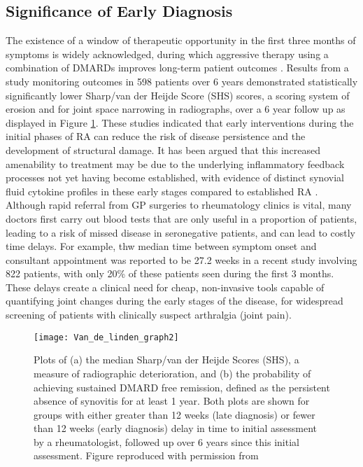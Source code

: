 \documentclass[twoside]{bhamthesis}
\theoremstyle{definition}
\begin{document}
\subsection{Significance of Early Diagnosis}

The existence of a window of therapeutic opportunity \cite{nell2004benefit} in the first three months of symptoms is widely acknowledged, during which aggressive therapy using a combination of DMARDs improves long-term patient outcomes \cite{landewe2002cobra}. Results from a study monitoring outcomes in 598 patients over 6 years \cite{van2010long} demonstrated statistically significantly lower Sharp/van der Heijde Score (SHS) scores, a scoring system of erosion and for joint space narrowing in radiographs, over a 6 year follow up as displayed in Figure \ref{fig:Van_de_linden_graph2}. These studies indicated that early interventions during the initial phases of RA can reduce the risk of disease persistence and the development of structural damage. It has been argued that this increased amenability to treatment may be due to the underlying inflammatory feedback processes not yet having become established, with evidence of distinct synovial fluid cytokine profiles in these early stages compared to established RA \cite{raza2005early}. Although rapid referral from GP surgeries to rheumatology clinics is vital, many doctors first carry out blood tests that are only useful in a proportion of patients, leading to a risk of missed disease in seronegative patients, and can lead to costly time delays. For example, thw median time between symptom onset and consultant appointment was reported to be 27.2 weeks in a recent study involving 822 patients, with only 20\% of these patients seen during the first 3 months\cite{stack2019delays}. These delays create a clinical need for cheap, non-invasive tools capable of quantifying joint changes during the early stages of the disease, for widespread screening of patients with clinically suspect arthralgia (joint pain).

\begin{figure}[!ht]
\centering\texttt{[image: Van\_de\_linden\_graph2]}
\caption[Plots of (a) the median Sharp/van der Heijde Scores (SHS), a measure of radiographic deterioration, and (b) the probability of achieving sustained DMARD free remission, defined as the persistent absence of synovitis for at least 1 year. Both plots are shown for groups with either greater than 12 weeks (late diagnosis) or fewer than 12 weeks (early diagnosis) delay in time to initial assessment by a rheumatologist, followed up over 6 years since this initial assessment.]{Plots of (a) the median Sharp/van der Heijde Scores (SHS), a measure of radiographic deterioration, and (b) the probability of achieving sustained DMARD free remission, defined as the persistent absence of synovitis for at least 1 year. Both plots are shown for groups with either greater than 12 weeks (late diagnosis) or fewer than 12 weeks (early diagnosis) delay in time to initial assessment by a rheumatologist, followed up over 6 years since this initial assessment. Figure reproduced with permission from \cite{van2010long}}
 \label{fig:Van_de_linden_graph2}
\end{figure}
\end{document}
